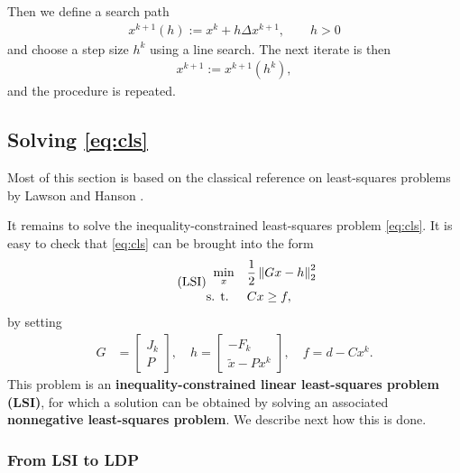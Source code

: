 \documentclass{article}
\numberwithin{equation}{section}
\theoremstyle{nonumberplain}
\newcommand{\funk}{ F_k }
\newcommand{\jack}{ J_k }
\begin{document}
Then we define a search path
\begin{align*}
x^{k+1}(h) := x^k + h \Delta x^{k+1}, \qquad h > 0
\end{align*}
and choose a step size $h^k$ using a line search. The next iterate is then
\begin{align*}
x^{k+1} := x^{k+1}(h^k),
\end{align*}
and the procedure is repeated.

\subsection{Solving \eqref{eq:cls}}

Most of this section is based on the classical reference on least-squares problems by Lawson and Hanson \cite{LawHan74}.

It remains to solve the inequality-constrained least-squares problem \eqref{eq:cls}. It is easy to check that \eqref{eq:cls} can be brought into the form
\begin{equation}\tag{LSI}\label{eq:lsi}
\begin{aligned}
\min_x \quad & \frac{1}{2} \left\| Gx - h \right\|_2^2 \\
\text{s. t. } \quad & C x \geq f,
\end{aligned}
\end{equation}
by setting
\begin{align*}
G &= \begin{bmatrix}
\jack \\ P
\end{bmatrix}, \quad h = \begin{bmatrix}
- \funk \\ \tilde x - P x^k
\end{bmatrix}, \quad f = d - C x^k.
\end{align*}
This problem is an \textbf{inequality-constrained linear least-squares problem (LSI)}, for which a solution can be obtained by solving an associated \textbf{nonnegative least-squares problem}. We describe next how this is done.

\subsubsection{From LSI to LDP}
\end{document}
